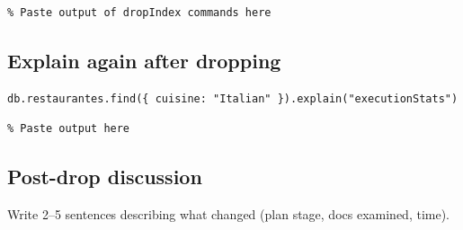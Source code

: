 \documentclass[11pt]{article}
\begin{document}
\begin{out}
\begin{verbatim}
% Paste output of dropIndex commands here
\end{verbatim}
\end{out}

\subsection{Explain again after dropping}
\begin{cmd}
\begin{verbatim}
db.restaurantes.find({ cuisine: "Italian" }).explain("executionStats")
\end{verbatim}
\end{cmd}

\begin{out}
\begin{verbatim}
% Paste output here
\end{verbatim}
\end{out}

\subsection{Post-drop discussion}
Write 2--5 sentences describing what changed (plan stage, docs examined, time).

\vspace{2.0cm}
\end{document}
